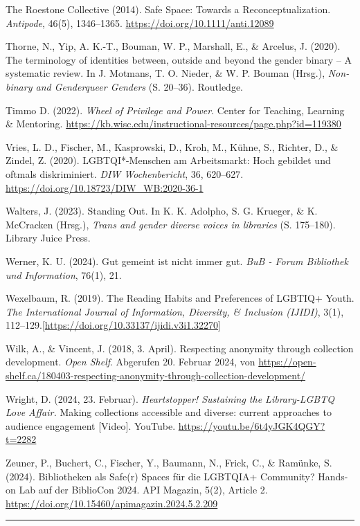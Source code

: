 \documentclass[a4paper,
fontsize=11pt,
oneside,
numbers=noperiodatend,
parskip=half-,
bibliography=totoc,
final
]{scrartcl}
\begin{document}
The Roestone Collective (2014). Safe Space: Towards a
Reconceptualization. \emph{Antipode}, 46(5), 1346--1365.
\url{https://doi.org/10.1111/anti.12089}

Thorne, N., Yip, A. K.-T., Bouman, W. P., Marshall, E., \& Arcelus, J.
(2020). The terminology of identities between, outside and beyond the
gender binary -- A systematic review. In J. Motmans, T. O. Nieder, \& W.
P. Bouman (Hrsg.), \emph{Non-binary and Genderqueer Genders} (S. 20--36).
Routledge.

Timmo D. (2022). \emph{Wheel of Privilege and Power}. Center for
Teaching, Learning \& Mentoring.
\url{https://kb.wisc.edu/instructional-resources/page.php?id=119380}

Vries, L. D., Fischer, M., Kasprowski, D., Kroh, M., Kühne, S., Richter,
D., \& Zindel, Z. (2020). LGBTQI*-Menschen am Arbeitsmarkt: Hoch
gebildet und oftmals diskriminiert. \emph{DIW Wochenbericht}, 36,
620--627. \url{https://doi.org/10.18723/DIW_WB:2020-36-1}

Walters, J. (2023). Standing Out. In K. K. Adolpho, S. G. Krueger, \& K.
McCracken (Hrsg.), \emph{Trans and gender diverse voices in libraries}
(S. 175--180). Library Juice Press.

Werner, K. U. (2024). Gut gemeint ist nicht immer gut. \emph{BuB - Forum
Bibliothek und Information}, 76(1), 21.

Wexelbaum, R. (2019). The Reading Habits and Preferences of LGBTIQ+
Youth. \emph{The International Journal of Information, Diversity, \&
Inclusion (IJIDI)}, 3(1),
112--129.{[}\url{https://doi.org/10.33137/ijidi.v3i1.32270}{]}

Wilk, A., \& Vincent, J. (2018, 3. April). Respecting anonymity through
collection development. \emph{Open Shelf}. Abgerufen 20. Februar 2024,
von
\url{https://open-shelf.ca/180403-respecting-anonymity-through-collection-development/}

Wright, D. (2024, 23. Februar). \emph{Heartstopper! Sustaining the
Library-LGBTQ Love Affair.} Making collections accessible and diverse:
current approaches to audience engagement {[}Video{]}. YouTube.
\url{https://youtu.be/6t4yJGK4QGY?t=2282}

Zeuner, P., Buchert, C., Fischer, Y., Baumann, N., Frick, C., \&
Ramünke, S. (2024). Bibliotheken als Safe(r) Spaces für die LGBTQIA+
Community? Hands-on Lab auf der BiblioCon 2024. API Magazin, 5(2),
Article 2. \url{https://doi.org/10.15460/apimagazin.2024.5.2.209}

\begin{center}\rule{0.5\linewidth}{0.5pt}\end{center}
\end{document}
